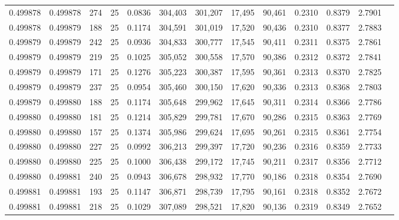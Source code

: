 \begin{tabular}{rrrrrrrrrrrrr}
0.499878 & 0.499878 &   274 &  25 &                                     0.0836 & 304,403 & 301,207 &  17,495 &  90,461 & 0.2310 & 0.8379 & 2.7901 \\
0.499878 & 0.499879 &   188 &  25 &                                     0.1174 & 304,591 & 301,019 &  17,520 &  90,436 & 0.2310 & 0.8377 & 2.7883 \\
0.499879 & 0.499879 &   242 &  25 &                                     0.0936 & 304,833 & 300,777 &  17,545 &  90,411 & 0.2311 & 0.8375 & 2.7861 \\
0.499879 & 0.499879 &   219 &  25 &                                     0.1025 & 305,052 & 300,558 &  17,570 &  90,386 & 0.2312 & 0.8372 & 2.7841 \\
0.499879 & 0.499879 &   171 &  25 &                                     0.1276 & 305,223 & 300,387 &  17,595 &  90,361 & 0.2313 & 0.8370 & 2.7825 \\
0.499879 & 0.499879 &   237 &  25 &                                     0.0954 & 305,460 & 300,150 &  17,620 &  90,336 & 0.2313 & 0.8368 & 2.7803 \\
0.499879 & 0.499880 &   188 &  25 &                                     0.1174 & 305,648 & 299,962 &  17,645 &  90,311 & 0.2314 & 0.8366 & 2.7786 \\
0.499880 & 0.499880 &   181 &  25 &                                     0.1214 & 305,829 & 299,781 &  17,670 &  90,286 & 0.2315 & 0.8363 & 2.7769 \\
0.499880 & 0.499880 &   157 &  25 &                                     0.1374 & 305,986 & 299,624 &  17,695 &  90,261 & 0.2315 & 0.8361 & 2.7754 \\
0.499880 & 0.499880 &   227 &  25 &                                     0.0992 & 306,213 & 299,397 &  17,720 &  90,236 & 0.2316 & 0.8359 & 2.7733 \\
0.499880 & 0.499880 &   225 &  25 &                                     0.1000 & 306,438 & 299,172 &  17,745 &  90,211 & 0.2317 & 0.8356 & 2.7712 \\
0.499880 & 0.499881 &   240 &  25 &                                     0.0943 & 306,678 & 298,932 &  17,770 &  90,186 & 0.2318 & 0.8354 & 2.7690 \\
0.499881 & 0.499881 &   193 &  25 &                                     0.1147 & 306,871 & 298,739 &  17,795 &  90,161 & 0.2318 & 0.8352 & 2.7672 \\
0.499881 & 0.499881 &   218 &  25 &                                     0.1029 & 307,089 & 298,521 &  17,820 &  90,136 & 0.2319 & 0.8349 & 2.7652 \\

\end{tabular}
